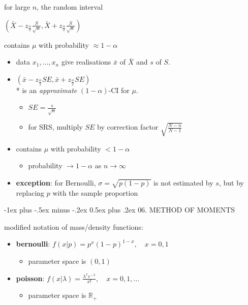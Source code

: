 \documentclass[10pt, landscape]{article}
\makeatletter
\renewcommand{\section}{\@startsection{section}{1}{0mm}%
  {-1ex plus -.5ex minus -.2ex}%
  {0.5ex plus .2ex}%
{\normalfont\large\bfseries}}
\newcommand{\xbar}{\bar{x}}
\newcommand{\Xbar}{\bar{X}}
\newcommand{\seq}[2][n]{#2_1, \dots, #2_{#1}}
\makeatother
\begin{document}
\begin{multicols*}{4}
  \begin{tightcenter}
    for large $n$, the random interval

    \( {\displaystyle{ \left( \Xbar-z_{\frac{\alpha}{2}}\frac{S}{\sqrt n}, \Xbar+z_{\frac{\alpha}{2}}\frac{S}{\sqrt n} \right) }} \) 

    contains $\mu$ with probability $\approx 1-\alpha$
  \end{tightcenter}

  \begin{itemize}
    \item data $\seq{x}$ give realisations $\xbar$ of $\Xbar$ and $s$ of $S$.
    \item $ \left( \xbar-z_{\frac{\alpha}{2}}SE, \xbar+z_{\frac{\alpha}{2}}SE \right) $ \\* is an \textit{approximate} $(1-\alpha)$-CI for $\mu$.
      \begin{itemize}
        \item $SE = \frac{s}{\sqrt n}$
        \item for SRS, multiply $SE$ by correction factor $\sqrt{\frac{N-n}{N-1}}$
      \end{itemize}
    \item contains $\mu$ with probability $<1-\alpha$
      \begin{itemize}
        \item probability $\to 1-\alpha$ as $n \to \infty$
      \end{itemize}
    \item \textbf{exception}: for Bernoulli, $\sigma = \sqrt{p(1-p)}$ is not estimated by $s$, but by replacing $p$ with the sample proportion
  \end{itemize}

  \section{06. METHOD OF MOMENTS}

  modified notation of mass/density functions:

  \begin{itemize}
    \item \textbf{bernoulli}: $f(x\vert p) = p^x (1-p)^{1-x}, \quad x=0,1$
      \begin{itemize}
        \item parameter space is $(0,1)$
      \end{itemize}
    \item \textbf{poisson}: $f(x \vert \lambda) = \frac{\lambda^xe^{-\lambda}}{x!}, \quad x=0,1,\dots$
      \begin{itemize}
        \item parameter space is $\mathbb{R}_+$
      \end{itemize}
  \end{itemize}


\end{multicols*}
\end{document}
